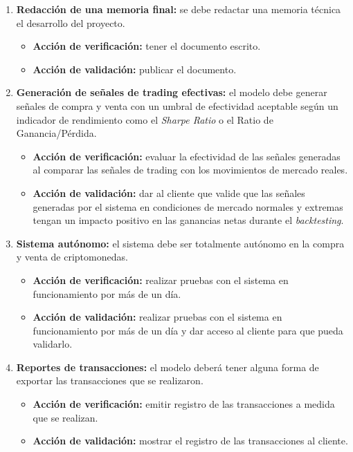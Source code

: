 \documentclass[
    11pt, %
]{charter}
\begin{document}
\begin{enumerate}
    \item \textbf{Redacción de una memoria final:} se debe redactar una memoria técnica  el desarrollo del proyecto.
      \begin{itemize}
      \item \textbf{Acción de verificación:} tener el documento escrito.
      \item \textbf{Acción de validación:} publicar el documento.
      \end{itemize}

    \item \textbf{Generación de señales de trading efectivas:} el modelo debe generar señales de compra y venta con un umbral de efectividad aceptable según un indicador de rendimiento como el \textit{Sharpe Ratio} o el Ratio de Ganancia/Pérdida.
      \begin{itemize}
      \item \textbf{Acción de verificación:} evaluar la efectividad de las señales generadas al comparar las señales de trading con los movimientos de mercado reales.
      \item \textbf{Acción de validación:} dar al cliente que valide que las señales generadas por el sistema en condiciones de mercado normales y extremas tengan un impacto positivo en las ganancias netas durante el \textit{backtesting}.
      \end{itemize}

    \item \textbf{Sistema autónomo:} el sistema debe ser totalmente autónomo en la compra y venta de criptomonedas.
      \begin{itemize}
      \item \textbf{Acción de verificación:} realizar pruebas con el sistema en funcionamiento por más de un día.
      \item \textbf{Acción de validación:} realizar pruebas con el sistema en funcionamiento por más de un día y dar acceso al cliente para que pueda validarlo.
      \end{itemize}

    \item \textbf{Reportes de transacciones:} el modelo deberá tener alguna forma de exportar las transacciones que se realizaron.
      \begin{itemize}
      \item \textbf{Acción de verificación:} emitir registro de las transacciones a medida que se realizan.
      \item \textbf{Acción de validación:} mostrar el registro de las transacciones al cliente.
      \end{itemize}


\end{enumerate}
\end{document}
